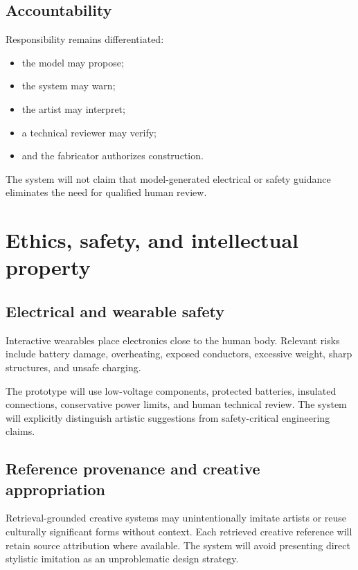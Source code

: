 \documentclass{article}
\begin{document}
\subsection{Accountability}

Responsibility remains differentiated:

\begin{itemize}[leftmargin=*]
    \item the model may propose;
    \item the system may warn;
    \item the artist may interpret;
    \item a technical reviewer may verify;
    \item and the fabricator authorizes construction.
\end{itemize}

The system will not claim that model-generated electrical or safety guidance
eliminates the need for qualified human review.

\section{Ethics, safety, and intellectual property}

\subsection{Electrical and wearable safety}

Interactive wearables place electronics close to the human body. Relevant risks
include battery damage, overheating, exposed conductors, excessive weight,
sharp structures, and unsafe charging.

The prototype will use low-voltage components, protected batteries, insulated
connections, conservative power limits, and human technical review. The system
will explicitly distinguish artistic suggestions from safety-critical
engineering claims.

\subsection{Reference provenance and creative appropriation}

Retrieval-grounded creative systems may unintentionally imitate artists or
reuse culturally significant forms without context. Each retrieved creative
reference will retain source attribution where available. The system will avoid
presenting direct stylistic imitation as an unproblematic design strategy.
\end{document}
